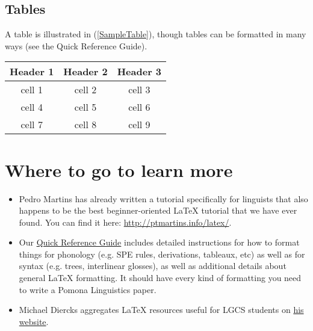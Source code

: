 \documentclass{article}
\begin{document}
\subsection{Tables}

A table is illustrated in (\ref{SampleTable}), though tables can be formatted in many ways (see the Quick Reference Guide).

\ea \label{SampleTable}
\begin{tabular}[t]{|c|c|c|}
\hline
\textbf{Header 1} & \textbf{Header 2} & \textbf{Header 3} \\
\hline\hline
cell 1 & cell 2 & cell 3 \\
\hline
cell 4 & cell 5 & cell 6 \\
\hline
cell 7 & cell 8 & cell 9 \\
\hline
\end{tabular}

\z 

\section{Where to go to learn more}

\begin{itemize}
    \item Pedro Martins has already written a tutorial specifically for linguists that also happens to be the best beginner-oriented \LaTeX{} tutorial that we have ever found. You can find it here: \url{http://ptmartins.info/latex/}.
    \item Our \href{https://www.overleaf.com/latex/templates/pomona-linguistics-quick-reference-guide/jthrqbrktmrd}{Quick Reference Guide} includes detailed instructions for how to format things for phonology (e.g. SPE rules, derivations, tableaux, etc) as well as for syntax (e.g. trees, interlinear glosses), as well as additional details about general \LaTeX{} formatting. It should have every kind of formatting you need to write a Pomona Linguistics paper.
    \item Michael Diercks aggregates \LaTeX{} resources useful for LGCS students on \href{http://pages.pomona.edu/~mjd14747/tex.html}{his website}.

\end{itemize}
\end{document}
